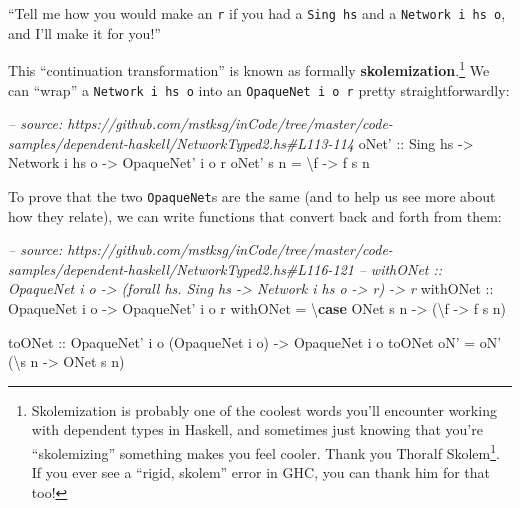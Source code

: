 \documentclass[]{article}
\newenvironment{Shaded}{}{}
\newcommand{\KeywordTok}[1]{\textcolor[rgb]{0.00,0.44,0.13}{\textbf{{#1}}}}
\newcommand{\DataTypeTok}[1]{\textcolor[rgb]{0.56,0.13,0.00}{{#1}}}
\newcommand{\CommentTok}[1]{\textcolor[rgb]{0.38,0.63,0.69}{\textit{{#1}}}}
\newcommand{\OtherTok}[1]{\textcolor[rgb]{0.00,0.44,0.13}{{#1}}}
\newcommand{\FunctionTok}[1]{\textcolor[rgb]{0.02,0.16,0.49}{{#1}}}
\newcommand{\NormalTok}[1]{{#1}}
\renewcommand{\href}[2]{#2\footnote{\url{#1}}}
\begin{document}
``Tell me how you would make an \texttt{r} if you had a \texttt{Sing\ hs} and a
\texttt{Network\ i\ hs\ o}, and I'll make it for you!''

This ``continuation transformation'' is known as formally
\textbf{skolemization}.\footnote{Skolemization is probably one of the coolest
  words you'll encounter working with dependent types in Haskell, and sometimes
  just knowing that you're ``skolemizing'' something makes you feel cooler.
  Thank you \href{https://en.wikipedia.org/wiki/Thoralf_Skolem}{Thoralf Skolem}.
  If you ever see a ``rigid, skolem'' error in GHC, you can thank him for that
  too!} We can ``wrap'' a \texttt{Network\ i\ hs\ o} into an
\texttt{OpaqueNet\textquotesingle{}\ i\ o\ r} pretty straightforwardly:

\begin{Shaded}
\begin{Highlighting}[]
\CommentTok{-- source: https://github.com/mstksg/inCode/tree/master/code-samples/dependent-haskell/NetworkTyped2.hs#L113-114}
\OtherTok{oNet' ::} \DataTypeTok{Sing} \NormalTok{hs }\OtherTok{->} \DataTypeTok{Network} \NormalTok{i hs o }\OtherTok{->} \DataTypeTok{OpaqueNet'} \NormalTok{i o r}
\NormalTok{oNet' s n }\FunctionTok{=} \NormalTok{\textbackslash{}f }\OtherTok{->} \NormalTok{f s n}
\end{Highlighting}
\end{Shaded}

To prove that the two \texttt{OpaqueNet}s are the same (and to help us see more
about how they relate), we can write functions that convert back and forth from
them:

\begin{Shaded}
\begin{Highlighting}[]
\CommentTok{-- source: https://github.com/mstksg/inCode/tree/master/code-samples/dependent-haskell/NetworkTyped2.hs#L116-121}
\CommentTok{-- withONet :: OpaqueNet i o -> (forall hs. Sing hs -> Network i hs o -> r) -> r}
\OtherTok{withONet ::} \DataTypeTok{OpaqueNet} \NormalTok{i o }\OtherTok{->} \DataTypeTok{OpaqueNet'} \NormalTok{i o r}
\NormalTok{withONet }\FunctionTok{=} \NormalTok{\textbackslash{}}\KeywordTok{case} \DataTypeTok{ONet} \NormalTok{s n }\OtherTok{->} \NormalTok{(\textbackslash{}f }\OtherTok{->} \NormalTok{f s n)}

\OtherTok{toONet ::} \DataTypeTok{OpaqueNet'} \NormalTok{i o (}\DataTypeTok{OpaqueNet} \NormalTok{i o) }\OtherTok{->} \DataTypeTok{OpaqueNet} \NormalTok{i o}
\NormalTok{toONet oN' }\FunctionTok{=} \NormalTok{oN' (\textbackslash{}s n }\OtherTok{->} \DataTypeTok{ONet} \NormalTok{s n)}
\end{Highlighting}
\end{Shaded}
\end{document}
